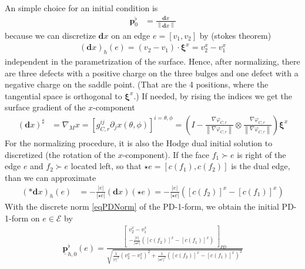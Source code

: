 \documentclass[a4paper,11pt]{scrartcl}
\newcommand{\exd}{\mathbf{d}}
\newcommand{\M}{M}
\newcommand{\pfl}{\mathbf{p}^{\flat}}
\newcommand{\PDpflhInit}{\underline{\mathbf{p}}^{\flat}_{h,0}}
\newcommand{\E}{\mathcal{E}}
\newcommand{\base}{\boldsymbol{\xi}}
\begin{document}
    An simple choice for an initial condition is
    \begin{align}
      \pfl_{0} &= \frac{\exd x}{\left\|\exd x  \right\|}
    \end{align}
    because we can discretize \( \exd x \) on an edge \( e=\left[ v_{1} , v_{2} \right] \) by (stokes theorem)
    \begin{align}
      \left( \exd x \right)_{h}(e) = \left( v_{2} - v_{1} \right)\cdot\base^{x} = v_{2}^{x} - v_{1}^{x} 
    \end{align}
    independent in the parametrization of the surface.
    Hence, after normalizing, there are three defects with a positive charge on the three bulges and one defect with a negative charge on the saddle point.
    (That are the 4 positions, where the tangential space is orthogonal to \( \base^{x} \).)
    If needed, by rising the indices we get the surface gradient of the \( x \)-component
    \begin{align}
      \left( \exd x \right)^{\sharp} &= \nabla_{\M}x
                  = \left[g^{ij}_{C,r}\partial_{j}x(\theta,\phi)\right]^{i=\theta,\phi}
                  = \left( I - \frac{\nabla \varphi_{C,r}}{\left\| \nabla \varphi_{C,r} \right\|}
                        \otimes\frac{\nabla \varphi_{C,r}}{\left\| \nabla \varphi_{C,r} \right\|} \right)\base^{x}
    \end{align}
    For the normalizing procedure, it is also the Hodge dual initial solution to discretized (the rotation of the \( x \)-component).
    If the face \( f_{1}\succ e \) is right of the edge \( e \) and \( f_{2}\succ e \) located left, 
    so that \( \star e = [c(f_{1}),c(f_{2})] \) is the dual edge, than we can approximate
    \begin{align}
      \left( *\exd x \right)_{h}(e) &= -\frac{\left| e \right|}{\left| \star e \right|} \left( \exd x \right)(\star e)
                                     = -\frac{\left| e \right|}{\left| \star e \right|} \left( \left[c(f_{2})  \right]^{x} - \left[c(f_{1})  \right]^{x} \right)
    \end{align}
    With the discrete norm \eqref{eqPDNorm} of the PD-1-form, we obtain the initial PD-1-form on \( e \in \E \) by
    \begin{align}
      \PDpflhInit(e) = \frac{
                       \begin{bmatrix}
                          v_{2}^{x} - v_{1}^{x}\\
            -\frac{\left| e \right|}{\left| \star e \right|} \left( \left[c(f_{2})  \right]^{x} - \left[c(f_{1})  \right]^{x} \right)
                       \end{bmatrix}_{PD}
                    }{\sqrt{\frac{1}{\left| e \right|^{2}}\left(v_{2}^{x} - v_{1}^{x}  \right)^{2}
                                     +\frac{1}{\left| \star e \right|^{2}}\left( \left[c(f_{2})  \right]^{x} - \left[c(f_{1})  \right]^{x}\right)^{2} }}
    \end{align}
\end{document}
